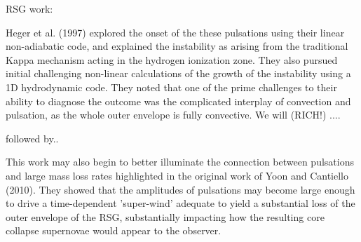  RSG work: 

Heger et al. (1997) explored the onset of the these pulsations using
their linear non-adiabatic code, and explained the instability 
as arising from the traditional Kappa mechanism acting in the
hydrogen ionization zone. They also pursued initial challenging
non-linear calculations of the growth of the instability using a 1D 
hydrodynamic code. They noted that one of the prime challenges to
their ability to diagnose the outcome was the complicated interplay of
convection and pulsation, as the whole outer envelope is fully
convective. We will (RICH!) .... 


followed by.. 


 This work may also begin to better illuminate the connection between
 pulsations and large mass loss rates highlighted in the original work
 of Yoon and Cantiello (2010). They showed that the amplitudes of
 pulsations may become large enough to drive a time-dependent
 'super-wind' adequate to yield a substantial loss of the outer
 envelope of the RSG, substantially impacting how the resulting core
 collapse supernovae would appear to the observer. 